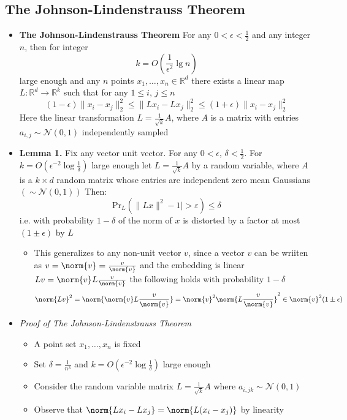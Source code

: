 \subsection{The Johnson-Lindenstrauss Theorem}
\begin{itemize}
  \item \textbf{The Johnson-Lindenstrauss Theorem} For any $0<\epsilon < \frac12$ and any integer $n$, then for integer
  \[
    k = O(\frac{1}{\epsilon^2} \lg n)
  \]
  large enough and any $n$ points $x_1, \dots, x_n \in \mathbb R^d$	there exists a linear map $L: \mathbb R^d \to \mathbb R^k$ such that for any $1 \leq i$, $j \leq n$
\[
	(1-\epsilon) \| x_i - x_j \|^2_2 \leq \|Lx_i - Lx_j \|^2_2 \leq (1+\epsilon)\|x_i - x_j\| ^2_ 2
\]
Here the linear transformation $L=\frac{1}{\sqrt{k}} A$, where $A$ is a matrix with entries $a_{i,j} \sim \mathcal N(0,1)$ independently sampled
  \item \textbf{Lemma 1.} Fix any vector unit vector. For any $0 < \epsilon$, $\delta < \frac12$. For $k = O(\epsilon^{-2} \log \frac1\delta)$ large enough let $L = \frac{1}{\sqrt k} A$ by a random variable, where $A$ is a $k \times d$ random matrix whose entries are independent zero mean Gaussians $(\sim \mathcal N(0,1))$ Then:
\[
	\text{Pr}_{L}\left(\|L x\|^{2}-1 |>\varepsilon\right) \leq \delta
\]
  i.e. with probability $1-\delta$ of the norm of $x$ is distorted by a factor at most $(1 \pm \epsilon)$ by $L$
  \begin{itemize}
  	\item This generalizes to any non-unit vector $v$, since a vector $v$ can be wriiten as $v = \norm{v} = \frac{v}{\norm{v}}$ and the embedding is linear $Lv = \norm{v}L \frac{v}{\norm{v}}$ the following holds with probability $1-\delta$
    \[
      \norm{Lv}^2 = \norm{\norm{v} L \frac{v}{\norm{v}}} = \norm{v}^2 \norm{L \frac{v}{\norm{v}}}^2 \in \norm{v}^2 (1 \pm \epsilon)
    \]
  \end{itemize}
  \item \textit{Proof of The Johnson-Lindenstrauss Theorem} 
  \begin{itemize}
    \item A point set $x_1, \dots, x_n$ is fixed
    \item Set $\delta = \frac{1}{n^3}$ and $k=O(\epsilon^{-2} \log \frac{1}{\delta})$ large enough 
    \item Consider the random variable matrix $L = \frac{1}{\sqrt{k}}A$ where $a_{i,jk} \sim \mathcal N(0,1)$
    \item Observe that $\norm{L x_i - L x_j} = \norm{L (x_i - x_j)}$ by linearity

\end{itemize}
\end{itemize}
